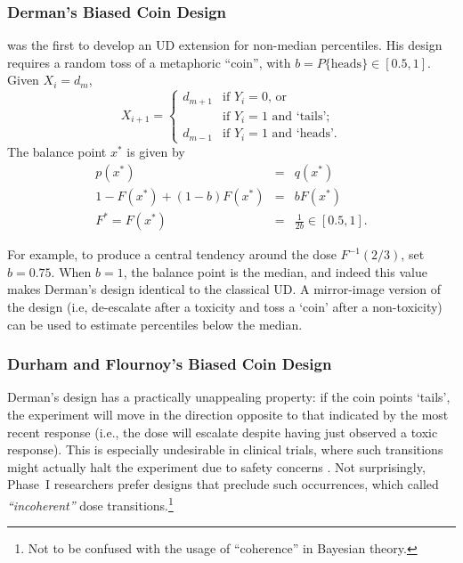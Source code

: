 \subsubsection{Derman's Biased Coin Design}
\cite{Derm:Nonp:1957} was the first to develop an UD extension for non-median percentiles. His design requires a random toss of a metaphoric ``coin'', with $b=P\{\textrm{heads}\}\in[0.5,1]$. Given $X_i=d_m$,
\begin{equation*}
X_{i+1}=
\begin{cases}
d_{m+1} &\textrm{if $Y_i=0$, or}\\
& \textrm{if $Y_i=1$ and `tails'; }\\
d_{m-1} &\textrm{if $Y_i=1$ and `heads'.}
\end{cases}
\end{equation*}
The balance point $x^*$ is given by
\begin{equation}\label{eq:dermanx*}
\begin{array}{rcl}
p(x^*)&=&q(x^*)\\
1-F\left(x^*\right)+(1-b)F\left(x^*\right) &=& bF\left(x^*\right)\\
F^*=F\left(x^*\right) &=& \frac{1}{2b}\in[0.5,1].
\end{array}
\end{equation}

For example, to produce a central tendency around the dose $F^{-1}(2/3)$, set $b=0.75$. When $b=1$, the balance point is the median, and indeed this value makes Derman's design identical to the classical UD. A mirror-image version of the design (i.e, de-escalate after a toxicity and toss a `coin' after a non-toxicity) can be used to estimate percentiles below the median.

\subsubsection{Durham and Flournoy's  Biased Coin Design}

Derman's design has a practically unappealing property: if the coin points `tails', the experiment will move in the direction opposite to that indicated by the most recent response (i.e., the dose will escalate despite having just observed a toxic response). This is especially undesirable in clinical trials, where such transitions might actually halt the experiment due to safety concerns \citep{Neunsch08}. Not surprisingly, Phase~I researchers prefer designs that preclude such occurrences, which \cite{Cheung:coherent:05} called \emph{``incoherent''} dose transitions.\footnote{Not to be confused with the usage of ``coherence'' in Bayesian theory.}

